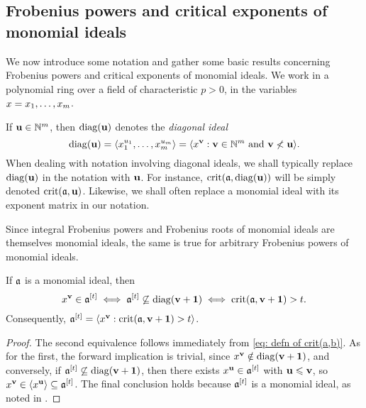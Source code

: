 \documentclass[11pt]{amsart}
\begin{document}
{\subsection{Frobenius powers and critical exponents of monomial ideals}

We now introduce some notation and gather some basic results concerning Frobenius powers and critical exponents of monomial ideals.
We work in a polynomial ring over a field of characteristic $p>0$, in the variables $x=x_1,\ldots,x_m$.

\begin{notation}
   If $\mathbf{u}\in \mathbb{N}^m$, then $\operatorname{diag}(\mathbf{u})$ denotes the \emph{diagonal ideal}
   \[ \operatorname{diag}(\mathbf{u}) = \langle x_1^{u_1},\ldots,x_m^{u_m} \rangle = \langle x^{\mathbf{v}} : \mathbf{v} \in \mathbb{N}^m \text{ and } \mathbf{v} \not < \mathbf{u} \rangle.\]
   When dealing with notation involving diagonal ideals, we shall typically replace $\operatorname{diag}(\mathbf{u})$ in the notation with $\mathbf{u}$.
   For instance, $\operatorname{crit}(\mathfrak{a},\operatorname{diag}(\mathbf{u}))$ will be simply denoted $\operatorname{crit}(\mathfrak{a},\mathbf{u})$.
   Likewise, we shall often replace a monomial ideal with its exponent matrix in our notation.
\end{notation}

\begin{remark}\label{rmk: Frobenius powers of monomial ideals are monomial ideals}
   Since integral Frobenius powers and Frobenius roots of monomial ideals are themselves monomial ideals, the same is true for arbitrary Frobenius powers of monomial ideals.
\end{remark}

\begin{proposition}\label{prop: description of frobenius powers in terms of crits}
   If $\mathfrak{a}$ is a monomial ideal, then
   \[ x^{\mathbf{v}} \in \mathfrak{a}^{[t]} \iff \mathfrak{a}^{[t]} \not \subseteq \operatorname{diag}(\mathbf{v}+\mathbf{1}) \iff \operatorname{crit}(\mathfrak{a}, \mathbf{v}+\mathbf{1}) > t.\]
   Consequently, $\mathfrak{a}^{[t]} = \langle x^{\mathbf{v}} : \operatorname{crit}(\mathfrak{a}, \mathbf{v}+\mathbf{1}) > t \rangle$.
\end{proposition}

\begin{proof}
   The second equivalence follows immediately from \eqref{eq: defn of crit(a,b)}.
   As for the first, the forward implication is trivial, since $x^{\mathbf{v}} \notin\operatorname{diag}(\mathbf{v}+\mathbf{1})$, and conversely, if $\mathfrak{a}^{[t]} \not \subseteq \operatorname{diag}(\mathbf{v}+\mathbf{1})$, then there exists $x^{\mathbf{u}} \in \mathfrak{a}^{[t]}$ with $\mathbf{u} \leqslant \mathbf{v}$, so $x^{\mathbf{v}}\in \langle x^{\mathbf{u}} \rangle \subseteq \mathfrak{a}^{[t]}$.
   The final conclusion holds because $\mathfrak{a}^{[t]}$ is a monomial ideal, as noted in .
\end{proof}

}
\end{document}
